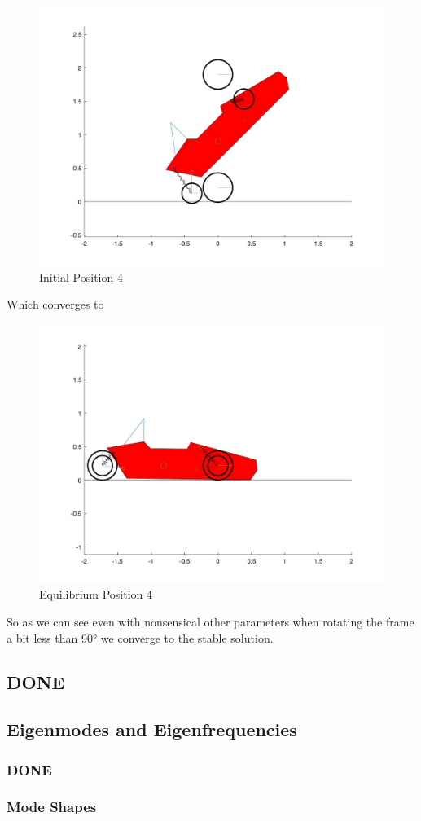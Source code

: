 \begin{figure}[ht]
    \centering
    \includegraphics[scale=0.235]{images/q_init_4.jpg}
    \caption{Initial Position 4}
    \label{fig:init_4}
\end{figure}

Which converges to 

\begin{figure}[ht]
    \centering
    \includegraphics[scale=0.235]{images/Equilibrium4.jpg}
    \caption{Equilibrium Position 4}
    \label{fig:eq_4}
\end{figure}

So as we can see even with nonsensical other parameters when rotating the frame a bit less than 90° we converge to the stable solution.

\subsection{DONE}
\subsection{Eigenmodes and Eigenfrequencies}
\subsubsection{DONE}
\subsubsection{Mode Shapes}